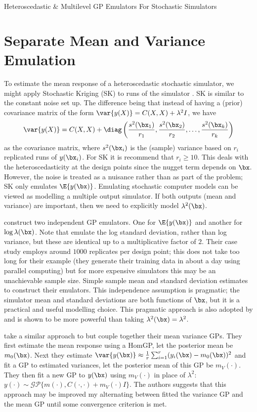 \begin{chapter}{Heteroscedastic \& Multilevel GP Emulators For Stochastic Simulators\label{Ch:Hetsml}}
\section{Separate Mean and Variance Emulation}

To estimate the mean response of a heteroscedastic stochastic simulator, we might apply Stochastic Kriging (SK) to runs of the simulator \citep{Akenman2010}. SK is similar to the constant noise set up. The difference being that instead of having a (prior) covariance matrix of the form $\var\{y (X)\} = C(X, X) + \lambda^2 I$, we have
\begin{equation}
	\var\{y (X)\} = C(X, X) + \diag\left( \frac{s^2(\bx_1)}{r_1},\frac{s^2(\bx_2)}{r_2}, \ldots, \frac{s^2(\bx_k)}{r_k} \right)
\end{equation}
as the covariance matrix, where $s^2(\bx_i)$ is the (sample) variance based on $r_i$ replicated runs of $y(\bx_i)$. For SK it is recommend that $r_i \geq 10$. This deals with the heteroscedasticity at the design points since the nugget term depends on $\bx$. However, the noise is treated as a nuisance rather than as part of the problem; SK only emulates $\E \{ y(\bx) \}$. Emulating stochastic computer models can be viewed as modelling a multiple output simulator. If both outputs (mean and variance) are important, then we need to explicitly model $\lambda^2(\bx)$.

\citet{Henderson09} construct two independent GP emulators. One for $\E \{y(\bx) \}$ and another for $ \log \lambda(\bx)$. Note that \citet{Henderson09} emulate the log standard deviation, rather than log variance, but these are identical up to a multiplicative factor of $2$. Their case study employs around $1000$ replicates per design point; this does not take too long for their example (they generate their training data in about a day using parallel computing) but for more expensive simulators this may be an unachievable sample size. Simple sample mean and standard deviation estimates to construct their emulators. This independence assumption is pragmatic; the simulator mean and standard deviations are both functions of $\bx$, but it is a practical and useful modelling choice\georgebox. This pragmatic approach is also adopted by \citet{Andrianakis2017} and is shown to be more powerful than taking $\lambda^2(\bx) = \lambda^2$.

\citet{Marrel2012} take a similar approach to \citet{Henderson09} but couple together their mean variance GPs. They first estimate the mean response using a HomGP, let the posterior mean be $m_0(\bx)$. Next they estimate $\var\{ y(\bx) \} \approx \frac{1}{r} \sum_{i=1}^r (y_i(\bx) - m_0(\bx))^2$ and fit a GP to estimated variances, let the posterior mean of this GP be $m_V(\cdot)$. They then fit a new GP to $y(\bx)$ using $m_V(\cdot)$ in place of $\lambda^2$: $y(\cdot) \sim \mathcal{GP} \{ m(\cdot), C(\cdot, \cdot) + m_V(\cdot)I \}$. The authors suggests that this approach may be improved my alternating between fitted the variance GP and the mean GP until some convergence criterion is met.


\end{chapter}
